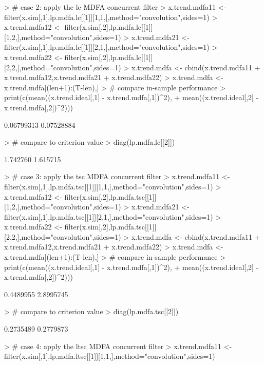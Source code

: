 \documentclass[a4paper]{book}
\begin{document}
\begin{Schunk}
\begin{Sinput}
> # case 2: apply the lc MDFA concurrent filter 
> x.trend.mdfa11 <- filter(x.sim[,1],lp.mdfa.lc[[1]][1,1,],method="convolution",sides=1)
> x.trend.mdfa12 <- filter(x.sim[,2],lp.mdfa.lc[[1]][1,2,],method="convolution",sides=1)
> x.trend.mdfa21 <- filter(x.sim[,1],lp.mdfa.lc[[1]][2,1,],method="convolution",sides=1)
> x.trend.mdfa22 <- filter(x.sim[,2],lp.mdfa.lc[[1]][2,2,],method="convolution",sides=1)
> x.trend.mdfa <- cbind(x.trend.mdfa11 + x.trend.mdfa12,x.trend.mdfa21 + x.trend.mdfa22)
> x.trend.mdfa <- x.trend.mdfa[(len+1):(T-len),] 
> # compare in-sample performance
> print(c(mean((x.trend.ideal[,1] - x.trend.mdfa[,1])^2),
+ 	mean((x.trend.ideal[,2] - x.trend.mdfa[,2])^2)))
\end{Sinput}
\begin{Soutput}
[1] 0.06799313 0.07528884
\end{Soutput}
\begin{Sinput}
> # compare to criterion value
> diag(lp.mdfa.lc[[2]])
\end{Sinput}
\begin{Soutput}
[1] 1.742760 1.615715
\end{Soutput}
\begin{Sinput}
> # case 3: apply the tsc MDFA concurrent filter 
> x.trend.mdfa11 <- filter(x.sim[,1],lp.mdfa.tsc[[1]][1,1,],method="convolution",sides=1)
> x.trend.mdfa12 <- filter(x.sim[,2],lp.mdfa.tsc[[1]][1,2,],method="convolution",sides=1)
> x.trend.mdfa21 <- filter(x.sim[,1],lp.mdfa.tsc[[1]][2,1,],method="convolution",sides=1)
> x.trend.mdfa22 <- filter(x.sim[,2],lp.mdfa.tsc[[1]][2,2,],method="convolution",sides=1)
> x.trend.mdfa <- cbind(x.trend.mdfa11 + x.trend.mdfa12,x.trend.mdfa21 + x.trend.mdfa22)
> x.trend.mdfa <- x.trend.mdfa[(len+1):(T-len),] 
> # compare in-sample performance
> print(c(mean((x.trend.ideal[,1] - x.trend.mdfa[,1])^2),
+ 	mean((x.trend.ideal[,2] - x.trend.mdfa[,2])^2)))
\end{Sinput}
\begin{Soutput}
[1] 0.4489955 2.8995745
\end{Soutput}
\begin{Sinput}
> # compare to criterion value
> diag(lp.mdfa.tsc[[2]])
\end{Sinput}
\begin{Soutput}
[1] 0.2735489 0.2779873
\end{Soutput}
\begin{Sinput}
> # case 4: apply the ltsc MDFA concurrent filter 
> x.trend.mdfa11 <- filter(x.sim[,1],lp.mdfa.ltsc[[1]][1,1,],method="convolution",sides=1)

\end{Sinput}
\end{Schunk}
\end{document}
